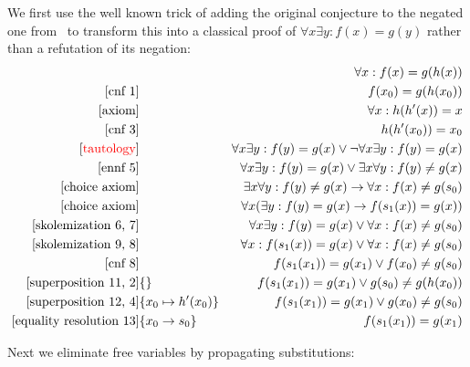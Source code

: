 \documentclass[onehalfspacing]{article}
\begin{document}
We first use the well known trick of adding the original conjecture to the negated one from~\cite{Luckham_1971} to transform this into a classical proof of $\forall x\exists y: f(x) = g(y)$ rather than a refutation of its negation:
\setcounter{equation}{0}
\begin{align}
	[\text{axiom}]&&\forall x: f(x) = g(h(x))\\
	[\text{cnf 1}]&&f(x_0) = g(h(x_0))\\
	[\text{axiom}]&&\forall x: h(h'(x)) = x\\
	[\text{cnf 3}]&&h(h'(x_0)) = x_0\\
	[\text{\color{red}{tautology}}]&&\forall x\exists y: f(y) = g(x)\vee\neg\forall x\exists y: f(y) = g(x)\\
	[\text{ennf 5}]&&\forall x\exists y: f(y) = g(x)\vee\exists x\forall y: f(y)\neq g(x)\\
	[\text{choice axiom}]&&\exists x\forall y: f(y)\neq g(x)\rightarrow \forall x : f(x) \neq g(s_0)\\
	[\text{choice axiom}]&&\forall x(\exists y: f(y)= g(x)\rightarrow f(s_1(x)) = g(x))\\
	[\text{skolemization 6, 7}]&&\forall x\exists y: f(y) = g(x)\vee\forall x: f(x)\neq g(s_0)\\
	[\text{skolemization 9, 8}]&&\forall x: f(s_1(x)) = g(x)\vee\forall x: f(x)\neq g(s_0)\\
	[\text{cnf 8}]&&f(s_1(x_1)) = g(x_1)\vee f(x_0)\neq g(s_0)\\
	[\text{superposition 11, 2}]&\{\}&f(s_1(x_1)) = g(x_1)\vee g(s_0)\neq g(h(x_0))\\
	[\text{superposition 12, 4}]&\{x_0\mapsto h'(x_0)\}&f(s_1(x_1)) = g(x_1)\vee g(x_0)\neq g(s_0)\\
	[\text{equality resolution 13}]&\{x_0\to s_0\}&f(s_1(x_1)) = g(x_1)
\end{align}

Next we eliminate free variables by propagating substitutions:
\end{document}

